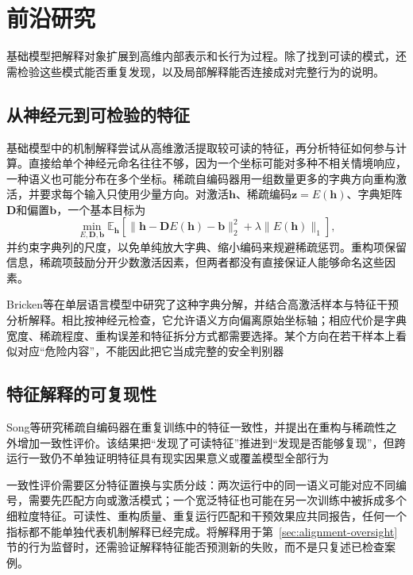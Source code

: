 \section{前沿研究}
\label{sec:interpretability-frontiers}

基础模型把解释对象扩展到高维内部表示和长行为过程。除了找到可读的模式，还需检验这些模式能否重复发现，以及局部解释能否连接成对完整行为的说明。

\subsection{从神经元到可检验的特征}

基础模型中的机制解释尝试从高维激活提取较可读的特征，再分析特征如何参与计算。直接给单个神经元命名往往不够，因为一个坐标可能对多种不相关情境响应，一种语义也可能分布在多个坐标。稀疏自编码器用一组数量更多的字典方向重构激活，并要求每个输入只使用少量方向。对激活$\bm h$、稀疏编码$\bm z=E(\bm h)$、字典矩阵$\bm D$和偏置$\bm b$，一个基本目标为
\begin{equation}
 \min_{E,\bm D,\bm b}
 \mathbb E_{\bm h}\!\left[
 \|\bm h-\bm D E(\bm h)-\bm b\|_2^2
 +\lambda\|E(\bm h)\|_1\right],
 \label{eq:interpretability-sae}
\end{equation}
并约束字典列的尺度，以免单纯放大字典、缩小编码来规避稀疏惩罚。重构项保留信息，稀疏项鼓励分开少数激活因素，但两者都没有直接保证人能够命名这些因素。

Bricken等在单层语言模型中研究了这种字典分解，并结合高激活样本与特征干预分析解释。相比按神经元检查，它允许语义方向偏离原始坐标轴；相应代价是字典宽度、稀疏程度、重构误差和特征拆分方式都需要选择。某个方向在若干样本上看似对应“危险内容”，不能因此把它当成完整的安全判别器

\subsection{特征解释的可复现性}

Song等研究稀疏自编码器在重复训练中的特征一致性，并提出在重构与稀疏性之外增加一致性评价。该结果把“发现了可读特征”推进到“发现是否能够复现”，但跨运行一致仍不单独证明特征具有现实因果意义或覆盖模型全部行为

一致性评价需要区分特征置换与实质分歧：两次运行中的同一语义可能对应不同编号，需要先匹配方向或激活模式；一个宽泛特征也可能在另一次训练中被拆成多个细粒度特征。可读性、重构质量、重复运行匹配和干预效果应共同报告，任何一个指标都不能单独代表机制解释已经完成。将解释用于第~\ref{sec:alignment-oversight}节的行为监督时，还需验证解释特征能否预测新的失败，而不是只复述已检查案例。


